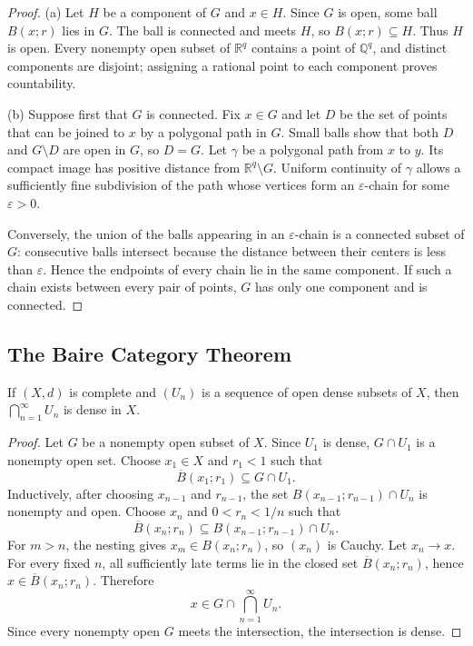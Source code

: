 \begin{proof}
(a) Let $H$ be a component of $G$ and $x\in H$. Since $G$ is open, some ball
$B(x;r)$ lies in $G$. The ball is connected and meets $H$, so
$B(x;r)\subseteq H$. Thus $H$ is open. Every nonempty open subset of
$\mathbb{R}^q$ contains a point of $\mathbb{Q}^q$, and distinct components
are disjoint; assigning a rational point to each component proves
countability.

(b) Suppose first that $G$ is connected. Fix $x\in G$ and let $D$ be the set
of points that can be joined to $x$ by a polygonal path in $G$. Small balls
show that both $D$ and $G\setminus D$ are open in $G$, so $D=G$. Let
$\gamma$ be a polygonal path from $x$ to $y$. Its compact image has positive
distance from $\mathbb{R}^q\setminus G$. Uniform continuity of $\gamma$
allows a sufficiently fine subdivision of the path whose vertices form an
$\varepsilon$-chain for some $\varepsilon>0$.

Conversely, the union of the balls appearing in an $\varepsilon$-chain is a
connected subset of $G$: consecutive balls intersect because the distance
between their centers is less than $\varepsilon$. Hence the endpoints of
every chain lie in the same component. If such a chain exists between every
pair of points, $G$ has only one component and is connected.
\end{proof}

\subsection{The Baire Category Theorem}

\begin{thm}
If $(X,d)$ is complete and $(U_n)$ is a sequence of open dense subsets of
$X$, then $\bigcap_{n=1}^\infty U_n$ is dense in $X$.
\end{thm}

\begin{proof}
Let $G$ be a nonempty open subset of $X$. Since $U_1$ is dense,
$G\cap U_1$ is a nonempty open set. Choose $x_1\in X$ and $r_1<1$ such that
\[
\overline B(x_1;r_1)\subseteq G\cap U_1.
\]
Inductively, after choosing $x_{n-1}$ and $r_{n-1}$, the set
$B(x_{n-1};r_{n-1})\cap U_n$ is nonempty and open. Choose $x_n$ and
$0<r_n<1/n$ such that
\[
\overline B(x_n;r_n)
\subseteq B(x_{n-1};r_{n-1})\cap U_n.
\]
For $m>n$, the nesting gives $x_m\in B(x_n;r_n)$, so $(x_n)$ is Cauchy. Let
$x_n\to x$. For every fixed $n$, all sufficiently late terms lie in the
closed set $\overline B(x_n;r_n)$, hence
$x\in\overline B(x_n;r_n)$. Therefore
\[
x\in G\cap\bigcap_{n=1}^\infty U_n.
\]
Since every nonempty open $G$ meets the intersection, the intersection is
dense.
\end{proof}

